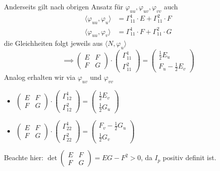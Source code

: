 \documentclass[../main.tex]{subfiles}
\begin{document}
Anderseits gilt nach obrigen Ansatz für $\varphi_{uu},\varphi_{uv},\varphi_{vv}$ auch \begin{align*}
    \langle\varphi_{uu},\varphi_{u}\rangle &= \Gamma_{11}^{1}\cdot E + \Gamma_{11}^{2}\cdot F\\
    \langle\varphi_{uu},\varphi_{v}\rangle &= \Gamma_{11}^{1}\cdot F + \Gamma_{11}^{2}\cdot G
\end{align*} die Gleichheiten folgt jeweils aus $\langle N,\varphi_{u}\rangle$
$$\implies \begin{pmatrix}
    E&F\\F&G
\end{pmatrix}\cdot \begin{pmatrix}
    \Gamma_{11}^{1}\\\Gamma_{11}^{2}
\end{pmatrix} = \begin{pmatrix}
    \frac{1}{2} E_{u}\\ F_{u}-\frac{1}{2}E_{v}
\end{pmatrix}$$
Analog erhalten wir via $\varphi_{uv}$ und $\varphi_{vv}$ \begin{itemize}
    \item $\begin{pmatrix}
        E&F\\F&G
    \end{pmatrix}\cdot\begin{pmatrix}
        \Gamma_{12}^{1}\\\Gamma_{12}^{2}
    \end{pmatrix} = \begin{pmatrix}
        \frac{1}{2}E_{v}\\\frac{1}{2}G_{u}
    \end{pmatrix}$
    \item $\begin{pmatrix}
        E&F\\F&G
    \end{pmatrix}\cdot\begin{pmatrix}
        \Gamma_{22}^{1}\\\Gamma_{22}^{2}
    \end{pmatrix} = \begin{pmatrix}
        F_{v}-\frac{1}{2}G_{u}\\\frac{1}{2}G_{v}
    \end{pmatrix}$
\end{itemize} Beachte hier: $\det{\begin{pmatrix}
    E&F\\F&G
\end{pmatrix}} = EG-F^{2} > 0$, da $I_{p}$ positiv definit ist.
\end{document}
